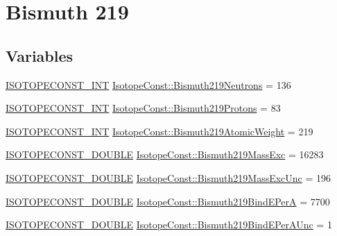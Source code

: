 \hypertarget{group___isotope_const-_bismuth-_bi219}{}\section{Bismuth 219}
\label{group___isotope_const-_bismuth-_bi219}
\subsection*{Variables}
\begin{DoxyCompactItemize}
\item 
\mbox{\hyperlink{group___isotope_const-_macros_ga5f18360b3e99483a35c32d789e62621c}{I\+S\+O\+T\+O\+P\+E\+C\+O\+N\+S\+T\+\_\+\+I\+NT}} \mbox{\hyperlink{group___isotope_const-_bismuth-_bi219_ga9980200724d6bad8076498ff11a7f5d9}{Isotope\+Const\+::\+Bismuth219\+Neutrons}} = 136
\item 
\mbox{\hyperlink{group___isotope_const-_macros_ga5f18360b3e99483a35c32d789e62621c}{I\+S\+O\+T\+O\+P\+E\+C\+O\+N\+S\+T\+\_\+\+I\+NT}} \mbox{\hyperlink{group___isotope_const-_bismuth-_bi219_gac5573c95791c508ff37de41ff698b431}{Isotope\+Const\+::\+Bismuth219\+Protons}} = 83
\item 
\mbox{\hyperlink{group___isotope_const-_macros_ga5f18360b3e99483a35c32d789e62621c}{I\+S\+O\+T\+O\+P\+E\+C\+O\+N\+S\+T\+\_\+\+I\+NT}} \mbox{\hyperlink{group___isotope_const-_bismuth-_bi219_gaae028afc5e77c86cfb969df95283714e}{Isotope\+Const\+::\+Bismuth219\+Atomic\+Weight}} = 219
\item 
\mbox{\hyperlink{group___isotope_const-_macros_ga8f45a7272ce02c0b4c65c44636ed719a}{I\+S\+O\+T\+O\+P\+E\+C\+O\+N\+S\+T\+\_\+\+D\+O\+U\+B\+LE}} \mbox{\hyperlink{group___isotope_const-_bismuth-_bi219_gaa68030a7fe6c00930d5a930977e8b6ca}{Isotope\+Const\+::\+Bismuth219\+Mass\+Exc}} = 16283
\item 
\mbox{\hyperlink{group___isotope_const-_macros_ga8f45a7272ce02c0b4c65c44636ed719a}{I\+S\+O\+T\+O\+P\+E\+C\+O\+N\+S\+T\+\_\+\+D\+O\+U\+B\+LE}} \mbox{\hyperlink{group___isotope_const-_bismuth-_bi219_gad794e0e54a01e95fea66d780b960d99f}{Isotope\+Const\+::\+Bismuth219\+Mass\+Exc\+Unc}} = 196
\item 
\mbox{\hyperlink{group___isotope_const-_macros_ga8f45a7272ce02c0b4c65c44636ed719a}{I\+S\+O\+T\+O\+P\+E\+C\+O\+N\+S\+T\+\_\+\+D\+O\+U\+B\+LE}} \mbox{\hyperlink{group___isotope_const-_bismuth-_bi219_gaf19dee7db84c44af67e2d0f5469271f9}{Isotope\+Const\+::\+Bismuth219\+Bind\+E\+PerA}} = 7700
\item 
\mbox{\hyperlink{group___isotope_const-_macros_ga8f45a7272ce02c0b4c65c44636ed719a}{I\+S\+O\+T\+O\+P\+E\+C\+O\+N\+S\+T\+\_\+\+D\+O\+U\+B\+LE}} \mbox{\hyperlink{group___isotope_const-_bismuth-_bi219_ga4879ffa65c161e5d13778539e6833b83}{Isotope\+Const\+::\+Bismuth219\+Bind\+E\+Per\+A\+Unc}} = 1

\end{DoxyCompactItemize}
